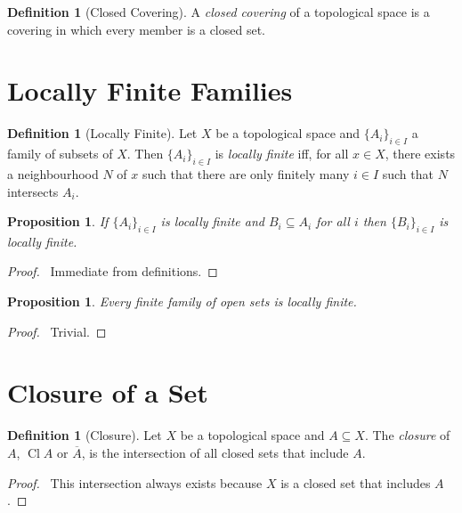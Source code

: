 \documentclass{report}
\let\qed\relax
\newtheorem{prop}[lm]{Proposition}
\theoremstyle{definition}
\newtheorem{df}[lm]{Definition}
\newcommand{\Cl}{\ensuremath{\operatorname{Cl}}}
\begin{document}
  \begin{df}[Closed Covering]
    A \emph{closed covering} of a topological space is a covering in which
    every member is a closed set.
  \end{df}

  \section{Locally Finite Families}

  \begin{df}[Locally Finite]
    Let $X$ be a topological space and $\{ A_i \}_{i \in I}$ a family of
    subsets of $X$. Then $\{ A_i \}_{i \in I}$ is \emph{locally finite} iff,
    for all $x \in X$, there exists a neighbourhood $N$ of $x$ such that there
    are only finitely many $i \in I$ such that $N$ intersects $A_i$.
  \end{df}

  \begin{prop}
    If $\{ A_i \}_{i \in I}$ is locally finite and $B_i \subseteq A_i$ for all
    $i$ then $\{ B_i \}_{i \in I}$ is locally finite.
  \end{prop}

  \begin{proof}
    \pf\ Immediate from definitions. \qed
  \end{proof}

  \begin{prop}
    Every finite family of open sets is locally finite.
  \end{prop}

  \begin{proof}
    \pf\ Trivial. \qed
  \end{proof}

  \section{Closure of a Set}

  \begin{df}[Closure]
    Let $X$ be a topological space and $A \subseteq X$. The \emph{closure} of
    $A$, $\Cl A$ or $\overline{A}$, is the intersection of all closed sets that
    include $A$.
  \end{df}

  \begin{proof}
    \pf\ This intersection always exists because $X$ is a closed set that
    includes $A$. \qed
  \end{proof}
\end{document}
